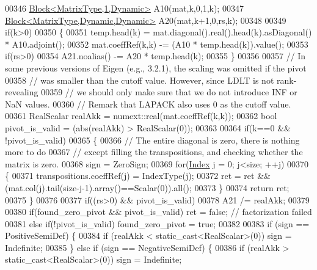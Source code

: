 \begin{DoxyCode}
00346       \hyperlink{group___core___module_class_eigen_1_1_block}{Block<MatrixType,1,Dynamic>} A10(mat,k,0,1,k);
00347       \hyperlink{group___core___module_class_eigen_1_1_block}{Block<MatrixType,Dynamic,Dynamic>} A20(mat,k+1,0,rs,k);
00348 
00349       \textcolor{keywordflow}{if}(k>0)
00350       \{
00351         temp.head(k) = mat.diagonal().real().head(k).asDiagonal() * A10.adjoint();
00352         mat.coeffRef(k,k) -= (A10 * temp.head(k)).value();
00353         \textcolor{keywordflow}{if}(rs>0)
00354           A21.noalias() -= A20 * temp.head(k);
00355       \}
00356 
00357       \textcolor{comment}{// In some previous versions of Eigen (e.g., 3.2.1), the scaling was omitted if the pivot}
00358       \textcolor{comment}{// was smaller than the cutoff value. However, since LDLT is not rank-revealing}
00359       \textcolor{comment}{// we should only make sure that we do not introduce INF or NaN values.}
00360       \textcolor{comment}{// Remark that LAPACK also uses 0 as the cutoff value.}
00361       RealScalar realAkk = numext::real(mat.coeffRef(k,k));
00362       \textcolor{keywordtype}{bool} pivot\_is\_valid = (abs(realAkk) > RealScalar(0));
00363 
00364       \textcolor{keywordflow}{if}(k==0 && !pivot\_is\_valid)
00365       \{
00366         \textcolor{comment}{// The entire diagonal is zero, there is nothing more to do}
00367         \textcolor{comment}{// except filling the transpositions, and checking whether the matrix is zero.}
00368         sign = ZeroSign;
00369         \textcolor{keywordflow}{for}(\hyperlink{namespace_eigen_a62e77e0933482dafde8fe197d9a2cfde}{Index} j = 0; j<size; ++j)
00370         \{
00371           transpositions.coeffRef(j) = IndexType(j);
00372           ret = ret && (mat.col(j).tail(size-j-1).array()==Scalar(0)).all();
00373         \}
00374         \textcolor{keywordflow}{return} ret;
00375       \}
00376 
00377       \textcolor{keywordflow}{if}((rs>0) && pivot\_is\_valid)
00378         A21 /= realAkk;
00379 
00380       \textcolor{keywordflow}{if}(found\_zero\_pivot && pivot\_is\_valid) ret = \textcolor{keyword}{false}; \textcolor{comment}{// factorization failed}
00381       \textcolor{keywordflow}{else} \textcolor{keywordflow}{if}(!pivot\_is\_valid) found\_zero\_pivot = \textcolor{keyword}{true};
00382 
00383       \textcolor{keywordflow}{if} (sign == PositiveSemiDef) \{
00384         \textcolor{keywordflow}{if} (realAkk < static\_cast<RealScalar>(0)) sign = Indefinite;
00385       \} \textcolor{keywordflow}{else} \textcolor{keywordflow}{if} (sign == NegativeSemiDef) \{
00386         \textcolor{keywordflow}{if} (realAkk > static\_cast<RealScalar>(0)) sign = Indefinite;

\end{DoxyCode}
